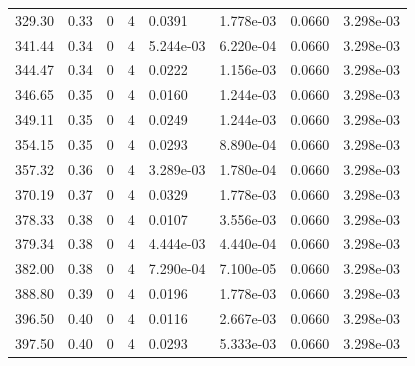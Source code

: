 \documentclass[preview]{standalone}
\begin{document}
{{{\begin{tabular}{L{1.2cm}C{1.2cm} C{0.3cm}C{0.5cm} C{1.4cm}C{1.4cm} C{1.4cm}C{1.4cm}}
  329.30  &  0.33  & 0     &  4 &  0.0391  & 1.778e-03  & 0.0660 &  3.298e-03   \\ 
  341.44  &  0.34  & 0     &  4 &  5.244e-03  & 6.220e-04  & 0.0660 &  3.298e-03   \\ 
  344.47  &  0.34  & 0     &  4 &  0.0222  & 1.156e-03  & 0.0660 &  3.298e-03   \\ 
  346.65  &  0.35  & 0     &  4 &  0.0160  & 1.244e-03  & 0.0660 &  3.298e-03   \\ 
  349.11  &  0.35  & 0     &  4 &  0.0249  & 1.244e-03  & 0.0660 &  3.298e-03   \\ 
  354.15  &  0.35  & 0     &  4 &  0.0293  & 8.890e-04  & 0.0660 &  3.298e-03   \\ 
  357.32  &  0.36  & 0     &  4 &  3.289e-03  & 1.780e-04  & 0.0660 &  3.298e-03   \\ 
  370.19  &  0.37  & 0     &  4 &  0.0329  & 1.778e-03  & 0.0660 &  3.298e-03   \\ 
  378.33  &  0.38  & 0     &  4 &  0.0107  & 3.556e-03  & 0.0660 &  3.298e-03   \\ 
  379.34  &  0.38  & 0     &  4 &  4.444e-03  & 4.440e-04  & 0.0660 &  3.298e-03   \\ 
  382.00  &  0.38  & 0     &  4 &  7.290e-04  & 7.100e-05  & 0.0660 &  3.298e-03   \\ 
  388.80  &  0.39  & 0     &  4 &  0.0196  & 1.778e-03  & 0.0660 &  3.298e-03   \\ 
  396.50  &  0.40  & 0     &  4 &  0.0116  & 2.667e-03  & 0.0660 &  3.298e-03   \\ 
  397.50  &  0.40  & 0     &  4 &  0.0293  & 5.333e-03  & 0.0660 &  3.298e-03   \\ 
\hline 
\end{tabular} 

}}}
\end{document}
